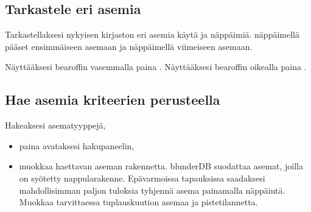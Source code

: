 \documentclass[letterpaper,10pt,finnish]{sphinxmanual}
\begin{document}
\subsection{Tarkastele eri asemia}
\label{\detokenize{guide_utilisateur:visualiser-les-differentes-positions}}
\sphinxAtStartPar
Tarkastellaksesi nykyisen kirjaston eri asemia käytä \sphinxhyphen{} ja \sphinxhyphen{}näppäimiä. \sphinxhyphen{}näppäimellä pääset ensimmäiseen asemaan ja \sphinxhyphen{}näppäimellä viimeiseen asemaan.

\sphinxAtStartPar
Näyttääksesi bearoffin vasemmalla paina . Näyttääksesi bearoffin oikealla paina .


\subsection{Hae asemia kriteerien perusteella}
\label{\detokenize{guide_utilisateur:rechercher-des-positions-selon-des-criteres}}
\sphinxAtStartPar
Hakeaksesi asematyyppejä,
\begin{itemize}
\item {} 
\sphinxAtStartPar
paina  avataksesi hakupaneelin,

\item {} 
\sphinxAtStartPar
muokkaa haettavan aseman rakennetta. blunderDB suodattaa asemat, joilla on  syötetty nappularakenne. Epävarmoissa tapauksissa saadaksesi mahdollisimman paljon tuloksia tyhjennä asema painamalla \sphinxhyphen{}näppäintä. Muokkaa tarvittaessa tuplauskuution asemaa ja pistetilannetta.

\end{itemize}
\end{document}
